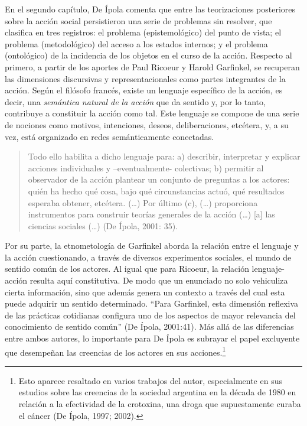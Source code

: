 En el segundo capítulo, De Ípola comenta que entre las teorizaciones posteriores sobre la acción social persistieron una serie de problemas sin resolver, que clasifica en tres registros: el problema (epistemológico) del punto de vista; el problema (metodológico) del acceso a los estados internos; y el problema (ontológico) de la incidencia de los objetos en el curso de la acción. Respecto al primero, a partir de los aportes de Paul Ricoeur y Harold Garfinkel, se recuperan las dimensiones discursivas y representacionales como partes integrantes de la acción. Según el filósofo francés, existe un lenguaje específico de la acción, es decir, una \emph{semántica natural de la acción} que da sentido y, por lo tanto, contribuye a constituir la acción como tal. Este lenguaje se compone de una serie de nociones como motivos, intenciones, deseos, deliberaciones, etcétera, y, a su vez, está organizado en redes semánticamente conectadas.

\begin{quote}
Todo ello habilita a dicho lenguaje para: a) describir, interpretar y explicar acciones individuales y --eventualmente- colectivas; b) permitir al observador de la acción plantear un conjunto de preguntas a los actores: quién ha hecho qué cosa, bajo qué circunstancias actuó, qué resultados esperaba obtener, etcétera. (\dots) Por último (c), (\dots) proporciona instrumentos para construir teorías generales de la acción (\dots) [a] las ciencias sociales (\dots) (De Ípola, 2001: 35).
\end{quote}

Por su parte, la etnometología de Garfinkel aborda la relación entre el lenguaje y la acción cuestionando, a través de diversos experimentos sociales, el mundo de sentido común de los actores. Al igual que para Ricoeur, la relación lenguaje-acción resulta aquí constitutiva. De modo que un enunciado no solo vehiculiza cierta información, sino que además genera un contexto a través del cual esta puede adquirir un sentido determinado. ``Para Garfinkel, esta dimensión reflexiva de las prácticas cotidianas configura uno de los aspectos de mayor relevancia del conocimiento de sentido común'' (De Ípola, 2001:41). Más allá de las diferencias entre ambos autores, lo importante para De Ípola es subrayar el papel excluyente que desempeñan las creencias de los actores en sus acciones.\footnote{Esto aparece resaltado en varios trabajos del autor, especialmente en sus estudios sobre las creencias de la sociedad argentina en la década de 1980 en relación a la efectividad de la crotoxina, una droga que supuestamente curaba el cáncer (De Ípola, 1997; 2002).}

